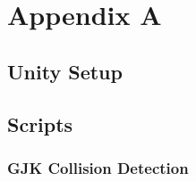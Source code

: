 %
%

\chapter{Appendix A}\label{app:app01}

\section{Unity Setup}\label{sec:unity_setup}

\section{Scripts}

\subsection{GJK Collision Detection}


